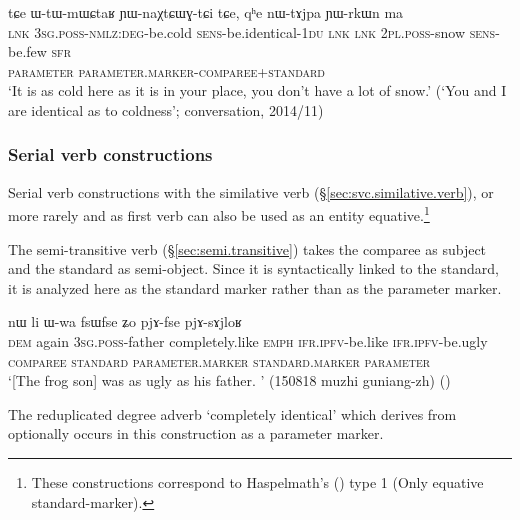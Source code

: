 \begin{exe}
\ex \label{ex:WtWmWCtaR.YWnaXtCWGtCi}
\glll tɕe ɯ-tɯ-mɯɕtaʁ ɲɯ-naχtɕɯɣ-tɕi tɕe, qʰe nɯ-tɤjpa ɲɯ-rkɯn ma\\
\textsc{lnk} \textsc{3sg}.\textsc{poss}-\textsc{nmlz}:\textsc{deg}-be.cold \textsc{sens}-be.identical-\textsc{1du} \textsc{lnk} \textsc{lnk} \textsc{2pl}.\textsc{poss}-snow \textsc{sens}-be.few \textsc{sfr}\\
{ } \textsc{parameter} \textsc{parameter}.\textsc{marker}-\textsc{comparee+standard}\\
\glt `It is as cold here as it is in your place, you don't have a lot of snow.' (`You and I are identical as to coldness'; conversation, 2014/11)
\end{exe}
%
\subsubsection{Serial verb constructions} \label{sec:svc.equative}
Serial verb constructions with the similative verb  (§\ref{sec:svc.similative.verb}), or more rarely   and  as first verb can also be used as an entity equative.\footnote{These constructions correspond to  Haspelmath's (\citeyear{haspelmath17equative}) type 1 (Only equative standard-marker). }


The semi-transitive verb  (§\ref{sec:semi.transitive})  takes the comparee as subject and the standard as semi-object. Since it is syntactically linked to the standard, it is analyzed here as the standard marker rather than as the parameter marker. 
  
\begin{exe}
\ex \label{ex:pjAfse.pjAsAjloR}
\glll nɯ li ɯ-wa fsɯfse ʑo pjɤ-fse pjɤ-sɤjloʁ \\
\textsc{dem} again \textsc{3sg}.\textsc{poss}-father completely.like \textsc{emph} \textsc{ifr}.\textsc{ipfv}-be.like \textsc{ifr}.\textsc{ipfv}-be.ugly \\
\textsc{comparee} { } \textsc{standard} \textsc{parameter}.\textsc{marker} { } \textsc{standard}.\textsc{marker} \textsc{parameter} \\
\glt `[The frog son] was as ugly as his father. ' (150818 muzhi guniang-zh)
()
\end{exe}

The reduplicated degree adverb  `completely identical' which derives from  optionally occurs in this construction as a parameter marker.

